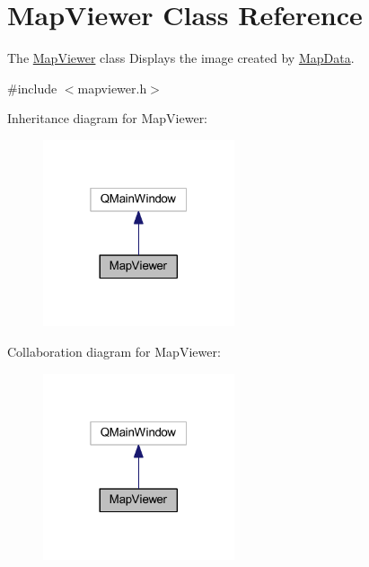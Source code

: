 \hypertarget{class_map_viewer}{\section{Map\+Viewer Class Reference}
\label{class_map_viewer}
}


The \hyperlink{class_map_viewer}{Map\+Viewer} class Displays the image created by \hyperlink{class_map_data}{Map\+Data}.  




{\ttfamily \#include $<$mapviewer.\+h$>$}



Inheritance diagram for Map\+Viewer\+:\nopagebreak
\begin{figure}[H]
\begin{center}
\leavevmode
\includegraphics[width=160pt]{class_map_viewer__inherit__graph}
\end{center}
\end{figure}


Collaboration diagram for Map\+Viewer\+:\nopagebreak
\begin{figure}[H]
\begin{center}
\leavevmode
\includegraphics[width=160pt]{class_map_viewer__coll__graph}
\end{center}
\end{figure}
